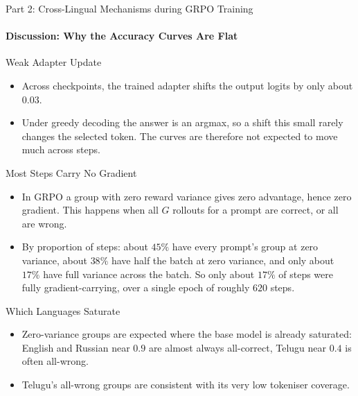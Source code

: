 \documentclass[aspectratio=169]{beamer}
\begin{document}
	\begin{frame}{Part 2: Cross-Lingual Mechanisms during GRPO Training}
		\framesubtitle{Discussion: Why the Accuracy Curves Are Flat}
		\begin{block}{\scriptsize Weak Adapter Update}\scriptsize
			\begin{itemize}
				\item Across checkpoints, the trained adapter shifts the output logits by only about $0.03$.
				\item Under greedy decoding the answer is an argmax, so a shift this small rarely changes the selected token. The curves are therefore not expected to move much across steps.
			\end{itemize}
		\end{block}
		\begin{block}{\scriptsize Most Steps Carry No Gradient}\scriptsize
			\begin{itemize}
				\item In GRPO a group with zero reward variance gives zero advantage, hence zero gradient. This happens when all $G$ rollouts for a prompt are correct, or all are wrong.
				\item By proportion of steps: about $45\%$ have every prompt's group at zero variance, about $38\%$ have half the batch at zero variance, and only about $17\%$ have full variance across the batch. So only about $17\%$ of steps were fully gradient-carrying, over a single epoch of roughly $620$ steps.
			\end{itemize}
		\end{block}
		\begin{block}{\scriptsize Which Languages Saturate}\scriptsize
			\begin{itemize}
				\item Zero-variance groups are expected where the base model is already saturated: English and Russian near $0.9$ are almost always all-correct, Telugu near $0.4$ is often all-wrong.
				\item Telugu's all-wrong groups are consistent with its very low tokeniser coverage. 
			\end{itemize}
			\end{block}
			\end{frame}
	
	
	
	
	
\end{document}
